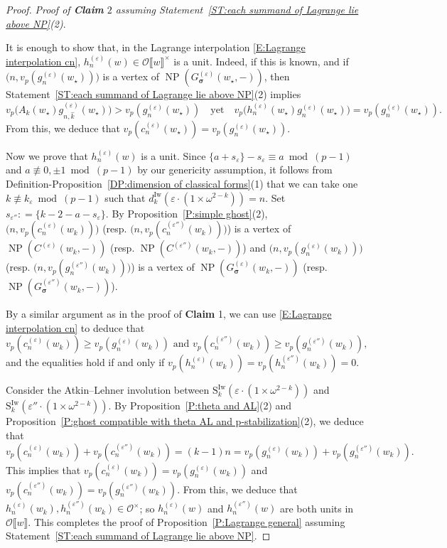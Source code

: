 \documentclass[12pt]{amsart}
\theoremstyle{definition}
\numberwithin{equation}{subsection}
\def\calO{\mathcal{O}}
\def\rmS{\mathrm{S}}
\DeclareMathOperator{\NP}{NP}
\newcommand{\bbsigma}{\boldsymbol{\sigma}}
\newcommand{\Iw}{\mathrm{Iw}}
\begin{document}
\begin{proof}
\medskip
\emph{Proof of {\bf Claim} $2$ assuming Statement~\ref{ST:each summand of Lagrange lie above NP}(2)}.

It is enough to show that, in the Lagrange interpolation \eqref{E:Lagrange interpolation cn}, $h_n^{(\varepsilon)}(w) \in \calO\llbracket w \rrbracket^\times$ is a unit. Indeed, if this is known, and if $\big(n, v_p(g_n^{(\varepsilon)}(w_\star))\big)$ is a vertex of $\NP(G_{\bbsigma}^{(\varepsilon)}(w_\star, -))$, then Statement~\ref{ST:each summand of Lagrange lie above NP}(2) implies
$$
v_p\big(A_k(w_\star)g^{(\varepsilon)}_{n,\hat k}(w_\star)\big) > v_p(g_n^{(\varepsilon)}(w_\star)) \quad \textrm{yet} \quad 
v_p\big(h_n^{(\varepsilon)}(w_\star)g_n^{(\varepsilon)}(w_\star)\big) = v_p(g_n^{(\varepsilon)}(w_\star)).
$$
From this, we deduce that $v_p(c_n^{(\varepsilon)}(w_\star)) = v_p(g_n^{(\varepsilon)}(w_\star))$.

Now we prove that $h_n^{(\varepsilon)}(w)$ is a unit.  Since $ \{a+s_\varepsilon \}-s_\varepsilon\equiv a\bmod (p-1) $ and $a\not\equiv 0,\pm 1 \bmod (p-1)$ by our genericity assumption, it follows from Definition-Proposition~\ref{DP:dimension of classical forms}(1) that we can take one $k \not \equiv k_\varepsilon \bmod{(p-1)}$ such that $d_k^\Iw(\varepsilon \cdot (1\times \omega^{2-k})) = n$. Set $s_{\varepsilon''}: =\{k-2-a-s_\varepsilon\}$.
By Proposition~\ref{P:simple ghost}(2), $\big(n, v_p(c_n^{(\varepsilon)}(w_k))\big)$ (resp. $\big(n, v_p(c_n^{(\varepsilon'')}(w_k))\big)$) is a vertex of $\NP(C^{(\varepsilon)}(w_k,-))$ (resp. $\NP(C^{(\varepsilon'')}(w_k,-))$) and $\big(n, v_p(g_n^{(\varepsilon)}(w_k))\big)$ (resp. $\big(n, v_p(g_n^{(\varepsilon'')}(w_k))\big)$) is a vertex of $\NP(G_{\bbsigma}^{(\varepsilon)}(w_k,-))$ (resp. $\NP(G_{\bbsigma}^{(\varepsilon'')}(w_k,-))$).

By a similar argument as in the proof of {\bf Claim} 1, we can use \eqref{E:Lagrange interpolation cn}  to deduce that  
$$
v_p(c_n^{(\varepsilon)}(w_k))\geq v_p(g_n^{(\varepsilon)}(w_k))\text{~and~}v_p(c_n^{(\varepsilon'')}(w_k))\geq v_p(g_n^{(\varepsilon'')}(w_k)),
$$
and the equalities hold if and only if $v_p(h_n^{(\varepsilon)}(w_k))=v_p(h_n^{(\varepsilon'')}(w_k))=0$.

Consider the Atkin--Lehner involution between $\rmS_k^\Iw(\varepsilon \cdot (1\times \omega^{2-k}))$ and $\rmS_k^\Iw(\varepsilon'' \cdot (1\times \omega^{2-k}))$. By Proposition~\ref{P:theta and AL}(2) and Proposition~\ref{P:ghost compatible with theta AL and p-stabilization}(2), we deduce that
$$
v_p(c_n^{(\varepsilon)}(w_k)) + v_p(c_n^{(\varepsilon'')}(w_k)) = (k-1)n = v_p(g_n^{(\varepsilon)}(w_k)) + v_p(g_n^{(\varepsilon'')}(w_k)).
$$
This implies that $v_p(c_n^{(\varepsilon)}(w_k)) = v_p(g_n^{(\varepsilon)}(w_k))$ and $v_p(c_n^{(\varepsilon'')}(w_k)) = v_p(g_n^{(\varepsilon'')}(w_k))$. From this, we deduce that $h_n^{(\varepsilon)}(w_k), h_n^{(\varepsilon'')}(w_k) \in \calO^\times$; so $h_n^{(\varepsilon)}(w)$ and $h_n^{(\varepsilon'')}(w)$ are both units in $\calO\llbracket w\rrbracket$. This completes the proof of Proposition~\ref{P:Lagrange general} assuming Statement~\ref{ST:each summand of Lagrange lie above NP}. 
\end{proof}
\end{document}
